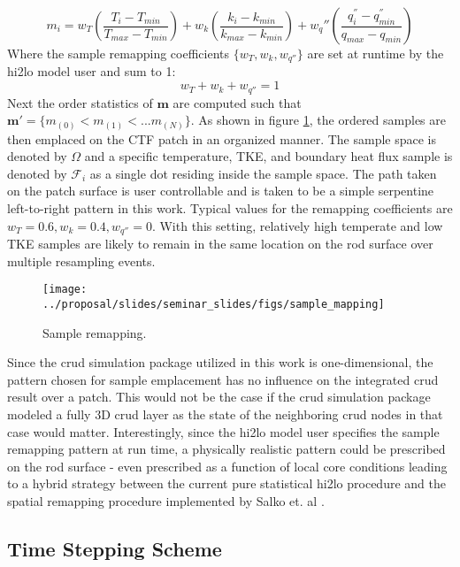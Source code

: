 \begin{equation}
    m_i = w_T \left( \frac{T_i - T_{min}}{T_{max} - T_{min}} \right) + w_k \left( \frac{k_i - k_{min}}{k_{max} - k_{min}} \right) +  w_q'' \left( \frac{q^{''}_i - q^{''}_{min}}{q_{max} - q_{min}} \right)
\label{eq:weighting}
\end{equation}
Where the sample remapping coefficients $\{w_T, w_k, w_{q''}\}$ are set at runtime by the hi2lo model user and sum to 1:
\begin{equation}
w_T + w_k + w_{q''} = 1
\end{equation}
Next the order statistics of $\mathbf m$ are computed such that $\mathbf m' = \{ m_{(0)} < m_{(1)}< ... m_{(N)} \}$.  As shown in figure \ref{fig:samplemapping}, the ordered samples are then emplaced on the CTF patch in an organized manner.  The sample space is denoted by $\Omega$ and a specific temperature, TKE, and boundary heat flux sample is denoted by $\mathcal F_i$ as a single dot residing inside the sample space.  The path taken on the patch surface is user controllable and is taken to be a simple serpentine left-to-right pattern in this work.
Typical values for the remapping coefficients are $w_T=0.6, w_k=0.4, w_{q''}=0$.  With this setting, relatively high temperate and low TKE samples are likely to remain in the same location on the rod surface over multiple resampling events.

\begin{figure}[H]
    \centering
    \texttt{[image: ../proposal/slides/seminar\_slides/figs/sample\_mapping]}
    \caption{Sample remapping.}
    \label{fig:samplemapping}
\end{figure}

Since the crud simulation package utilized in this work is one-dimensional, the pattern chosen for sample emplacement has no influence on the integrated crud result over a patch.  This would not be the case if the crud simulation package modeled a fully 3D crud layer as the state of the neighboring crud nodes in that case would matter.  Interestingly, since the hi2lo model user specifies the sample remapping pattern at run time, a physically realistic pattern could be prescribed on the rod surface - even prescribed as a function of local core conditions leading to a hybrid strategy between the current pure statistical hi2lo procedure and the spatial remapping procedure implemented by Salko et. al \cite{salko17}.

\subsection{Time Stepping Scheme}
\label{sec:time_step_scheme}

